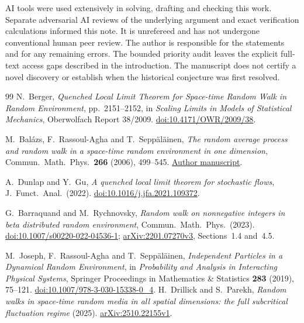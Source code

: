 \documentclass[11pt]{article}
\begin{document}
AI tools were used extensively in solving, drafting and checking
this work. Separate adversarial AI reviews of the underlying argument and exact
verification calculations informed this note.
It is unrefereed and has not undergone conventional human peer review.
The author is responsible for the statements and for any remaining
errors. The bounded priority audit leaves the explicit full-text
access gaps described in the introduction. The manuscript does not
certify a novel discovery or establish when the historical conjecture
was first resolved.

\begin{thebibliography}{99}
N.~Berger,
\emph{Quenched Local Limit Theorem for Space-time Random Walk in
Random Environment}, pp.~2151--2152, in
\emph{Scaling Limits in Models of Statistical Mechanics},
Oberwolfach Report 38/2009.
\href{https://doi.org/10.4171/OWR/2009/38}
     {doi:10.4171/OWR/2009/38}.

M.~Bal\'azs, F.~Rassoul-Agha and T.~Sepp\"al\"ainen,
\emph{The random average process and random walk in a space-time
random environment in one dimension},
Commun.\ Math.\ Phys.\ \textbf{266} (2006), 499--545.
\href{https://www.math.utah.edu/~firas/Papers/rap.pdf}
     {Author manuscript}.

A.~Dunlap and Y.~Gu,
\emph{A quenched local limit theorem for stochastic flows},
J.\ Funct.\ Anal.\ (2022).
\href{https://doi.org/10.1016/j.jfa.2021.109372}
     {doi:10.1016/j.jfa.2021.109372}.

G.~Barraquand and M.~Rychnovsky,
\emph{Random walk on nonnegative integers in beta distributed
random environment},
Commun.\ Math.\ Phys.\ (2023).
\href{https://doi.org/10.1007/s00220-022-04536-1}
     {doi:10.1007/s00220-022-04536-1};
\href{https://arxiv.org/abs/2201.07270v3}
     {arXiv:2201.07270v3}, Sections~1.4 and~4.5.

M.~Joseph, F.~Rassoul-Agha and T.~Sepp\"al\"ainen,
\emph{Independent Particles in a Dynamical Random Environment},
in \emph{Probability and Analysis in Interacting Physical Systems},
Springer Proceedings in Mathematics \& Statistics \textbf{283}
(2019), 75--121.
\href{https://doi.org/10.1007/978-3-030-15338-0_4}
     {doi:10.1007/978-3-030-15338-0\_4}.
H.~Drillick and S.~Parekh,
\emph{Random walks in space-time random media in all spatial
dimensions: the full subcritical fluctuation regime} (2025).
\href{https://arxiv.org/abs/2510.22155v1}{arXiv:2510.22155v1}.


\end{thebibliography}
\end{document}
